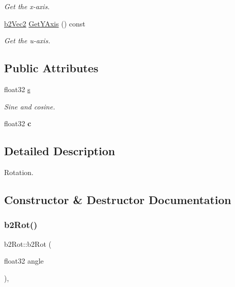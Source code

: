 \begin{DoxyCompactItemize}
\begin{DoxyCompactList}\small\item\em Get the x-\/axis. \end{DoxyCompactList}\item 
\mbox{\label{structb2Rot_ab057c4e9dc821099949391a6ded36dd6}} 
\mbox{\hyperlink{structb2Vec2}{b2\+Vec2}} \mbox{\hyperlink{structb2Rot_ab057c4e9dc821099949391a6ded36dd6}{Get\+Y\+Axis}} () const
\begin{DoxyCompactList}\small\item\em Get the u-\/axis. \end{DoxyCompactList}\end{DoxyCompactItemize}
\subsection*{Public Attributes}
\begin{DoxyCompactItemize}
\item 
\mbox{\label{structb2Rot_a15725ce0a89cc735ad90687b4c0f4dce}} 
float32 \mbox{\hyperlink{structb2Rot_a15725ce0a89cc735ad90687b4c0f4dce}{s}}
\begin{DoxyCompactList}\small\item\em Sine and cosine. \end{DoxyCompactList}\item 
\mbox{\label{structb2Rot_af23e5d31889dcb806ce46ce55aa81261}} 
float32 {\bfseries c}
\end{DoxyCompactItemize}


\subsection{Detailed Description}
Rotation. 

\subsection{Constructor \& Destructor Documentation}
\mbox{\label{structb2Rot_aa40dda6d390a2f54c793c63027a9b46e}} 
\subsubsection{\texorpdfstring{b2\+Rot()}{b2Rot()}}
{\footnotesize\ttfamily b2\+Rot\+::b2\+Rot (\begin{DoxyParamCaption}\item[{float32}]{angle }\end{DoxyParamCaption})\hspace{0.3cm}{\ttfamily [inline]}, {\ttfamily [explicit]}}



